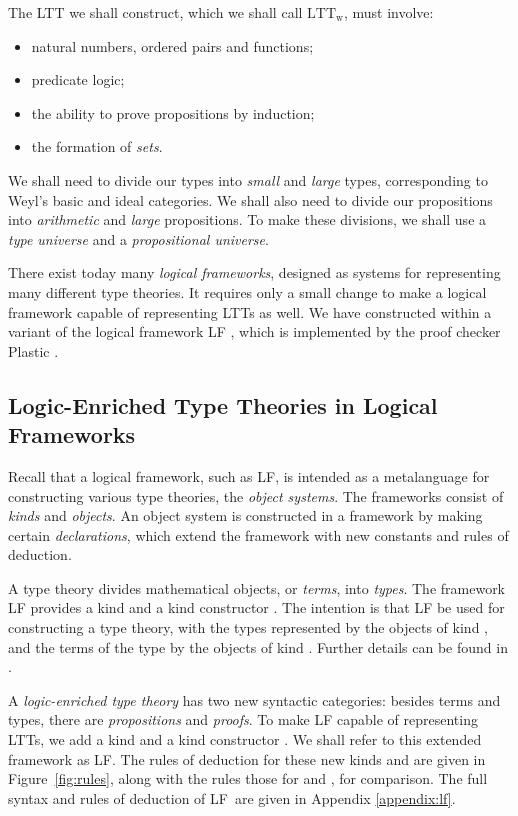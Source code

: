 \documentclass[acmtocl]{acmtrans2m}
\newcommand{\LTTW}{\ensuremath{\mathrm{LTT}_\mathrm{w}}}
\newcommand{\LF}{LF}
\begin{document}
The LTT we shall construct, which we shall call \LTTW, must involve:
\begin{itemize}
 \item
 natural numbers, ordered pairs and functions;
\item  predicate logic;
\item the ability to prove propositions by induction;
\item the formation of \emph{sets}.
\end{itemize}
We shall need to divide our types into \emph{small} and \emph{large} types, corresponding to Weyl's basic and ideal categories.  We shall also need to divide our propositions into \emph{arithmetic} and \emph{large} propositions.  To make these divisions, we shall use a \emph{type universe} and a \emph{propositional universe}.

There exist today many \emph{logical frameworks}, designed as
systems for representing many different type theories.  It requires
only a small change to make a logical framework capable of
representing LTTs as well.
We have constructed  within a variant of the logical framework
LF \cite{luo:car},
which is implemented by the proof checker Plastic \cite{plastic}.

\subsection{Logic-Enriched Type Theories in Logical Frameworks}

Recall that a logical framework, such as LF, is intended as a metalanguage for constructing various
type theories, the \emph{object systems}.  The frameworks consist of \emph{kinds} and \emph{objects}.  An object system is constructed in a framework by making certain \emph{declarations}, which extend the framework with new constants and rules of deduction.

A type theory divides mathematical objects, or \emph{terms}, into \emph{types}.  The framework LF provides a kind  and a kind constructor .  The intention is that LF be used for constructing a type theory, with the types represented by the objects of kind , and the terms of the type  by the objects of kind .  Further details can be found in \cite{luo:car}.

A \emph{logic-enriched type theory} has two new syntactic categories: besides terms and types, there are \emph{propositions} and \emph{proofs}.
To make LF capable of representing LTTs, we add a kind  and a
kind constructor .  We shall refer to this extended framework as \LF.
The rules of deduction for these new kinds  and
 are given in Figure~\ref{fig:rules}, along with the
rules those for  and , for comparison. The full syntax and
rules of deduction of \LF~are given in Appendix \ref{appendix:lf}.
\end{document}
